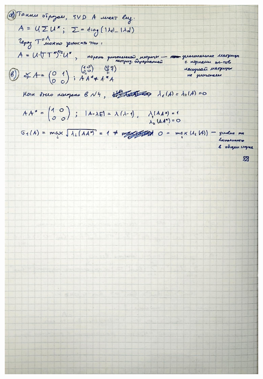 \documentclass{article}
\begin{document}
	\begin{figure}[h!]
		\includegraphics[width=0.95\linewidth]{handwritten/matcomp_hw1_7b}
	\end{figure}
	
\end{document}
